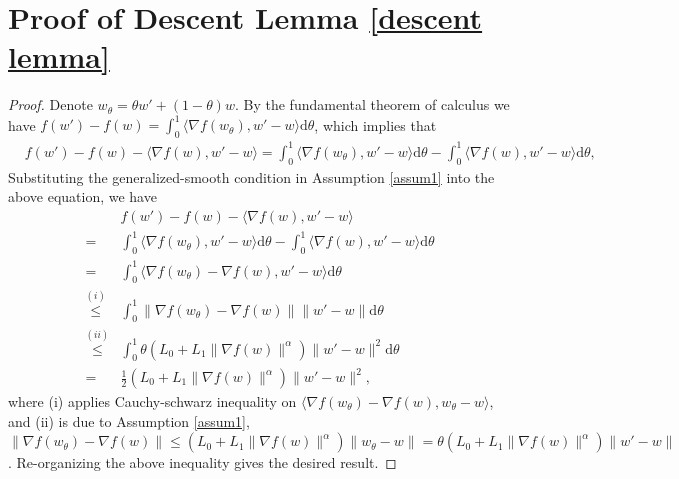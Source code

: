 \documentclass[10pt]{article} %
\newtheorem{proof}{Proof}
\begin{document}
\section{Proof of Descent Lemma \ref{descent lemma} }\label{Appendix B}
\mainlemmaone*
\begin{proof}\label{proof of descent lemma}
    Denote $w_{\theta} = \theta w'+(1-\theta)w$. By the fundamental theorem of calculus we have $f(w')-f(w)= \int_0^1 \langle \nabla f(w_{\theta}), w'-w\rangle \mathrm{d}\theta$, which implies that
    \begin{align}
        &f(w')-f(w)-\langle \nabla f(w), w'-w \rangle = \int_{0}^{1}\langle \nabla f(w_{\theta}), w'-w\rangle \mathrm{d} \theta - \int_{0}^{1} \langle \nabla f(w), w'-w\rangle \mathrm{d} \theta  \nonumber,
    \end{align}
    Substituting the generalized-smooth condition in Assumption \ref{assum1} into the above equation, we have
    \begin{align}
         &f(w')-f(w)-\langle \nabla f(w), w'-w \rangle \nonumber \\ 
        =& \int_{0}^{1}\langle \nabla f(w_{\theta}), w'-w\rangle \mathrm{d} \theta - \int_{0}^{1} \langle \nabla f(w), w'-w\rangle \mathrm{d} \theta  \nonumber \\
        =& \int_{0}^{1}\langle \nabla f(w_{\theta})-\nabla f(w), w'-w\rangle \mathrm{d} \theta \nonumber\\
        \overset{(i)}{\leq}& \int_{0}^{1} \big \|\nabla f(w_{\theta})-\nabla f(w) \big \| \big \|w'-w \big \|\mathrm{d}\theta \nonumber \\
        \overset{(ii)}{\leq}& \int_{0}^{1} \theta (L_0+L_1 \big \|\nabla f(w) \big \|^{\alpha})\big \|w'-w \big \|^2 \mathrm{d}\theta \nonumber \\
        =& \frac{1}{2}(L_0+L_1\big \|\nabla f(w) \big \|^{\alpha})\big \|w'-w \big \|^2,
    \end{align}
    where (i) applies Cauchy-schwarz inequality on $\langle \nabla f(w_{\theta})-\nabla f(w), w_{\theta}-w\rangle$, and  (ii) is due to Assumption \ref{assum1}, $\|\nabla f(w_{\theta})-\nabla f(w) \big \|\leq (L_0+L_1 \|\nabla f(w) \|^{\alpha})\|w_{\theta}-w\|=\theta(L_0+L_1 \|\nabla f(w) \|^{\alpha})\|w'-w\|$. Re-organizing the above inequality gives the desired result.
\end{proof}
\end{document}
